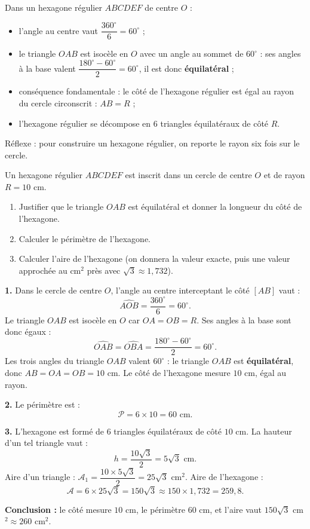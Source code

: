 \documentclass[11pt]{article}
\newcommand{\cle}[1]{{\popxbold\color{popdark}#1}}
\newcounter{popsec}
\newcounter{popsub}
\newcommand{\courssub}[1]{%
  \stepcounter{popsub}%
  \par\vspace{9pt}\noindent{\popxbold\fontsize{11.5}{13}\selectfont\color{popink}{\color{poporange}\thepopsec.\thepopsub}\hspace{6pt}#1}\par\nopagebreak\vspace{4pt}
}
\begin{document}
\courssub{Exploiter l'hexagone régulier}

\begin{propriete}
Dans un hexagone régulier $ABCDEF$ de centre $O$ :
\begin{itemize}
\item l'angle au centre vaut $\dfrac{360^\circ}{6} = 60^\circ$ ;
\item le triangle $OAB$ est isocèle en $O$ avec un angle au sommet de $60^\circ$ : ses angles à la base valent $\dfrac{180^\circ - 60^\circ}{2} = 60^\circ$, il est donc \textbf{équilatéral} ;
\item conséquence fondamentale : \cle{le côté de l'hexagone régulier est égal au rayon du cercle circonscrit} : $AB = R$ ;
\item l'hexagone régulier se décompose en $6$ triangles équilatéraux de côté $R$.
\end{itemize}
Réflexe : pour construire un hexagone régulier, on reporte le rayon six fois sur le cercle.
\end{propriete}

\begin{exoresolu}
Un hexagone régulier $ABCDEF$ est inscrit dans un cercle de centre $O$ et de rayon $R = 10$ cm.
\begin{enumerate}
\item Justifier que le triangle $OAB$ est équilatéral et donner la longueur du côté de l'hexagone.
\item Calculer le périmètre de l'hexagone.
\item Calculer l'aire de l'hexagone (on donnera la valeur exacte, puis une valeur approchée au cm$^2$ près avec $\sqrt{3} \approx 1{,}732$).
\end{enumerate}
\tcblower
\textbf{1.} Dans le cercle de centre $O$, l'angle au centre interceptant le côté $[AB]$ vaut :
\[ \widehat{AOB} = \frac{360^\circ}{6} = 60^\circ. \]
Le triangle $OAB$ est isocèle en $O$ car $OA = OB = R$. Ses angles à la base sont donc égaux :
\[ \widehat{OAB} = \widehat{OBA} = \frac{180^\circ - 60^\circ}{2} = 60^\circ. \]
Les trois angles du triangle $OAB$ valent $60^\circ$ : le triangle $OAB$ est \textbf{équilatéral}, donc $AB = OA = OB = 10$ cm.
Le côté de l'hexagone mesure $10$ cm, égal au rayon.

\textbf{2.} Le périmètre est :
\[ \mathcal{P} = 6 \times 10 = 60 \text{ cm}. \]

\textbf{3.} L'hexagone est formé de $6$ triangles équilatéraux de côté $10$ cm. La hauteur d'un tel triangle vaut :
\[ h = \frac{10\sqrt{3}}{2} = 5\sqrt{3} \text{ cm}. \]
Aire d'un triangle : $\mathcal{A}_1 = \dfrac{10 \times 5\sqrt{3}}{2} = 25\sqrt{3}$ cm$^2$.
Aire de l'hexagone :
\[ \mathcal{A} = 6 \times 25\sqrt{3} = 150\sqrt{3} \approx 150 \times 1{,}732 = 259{,}8. \]

\textbf{Conclusion :} le côté mesure $10$ cm, le périmètre $60$ cm, et l'aire vaut $150\sqrt{3}$ cm$^2 \approx 260$ cm$^2$.
\end{exoresolu}
\end{document}
